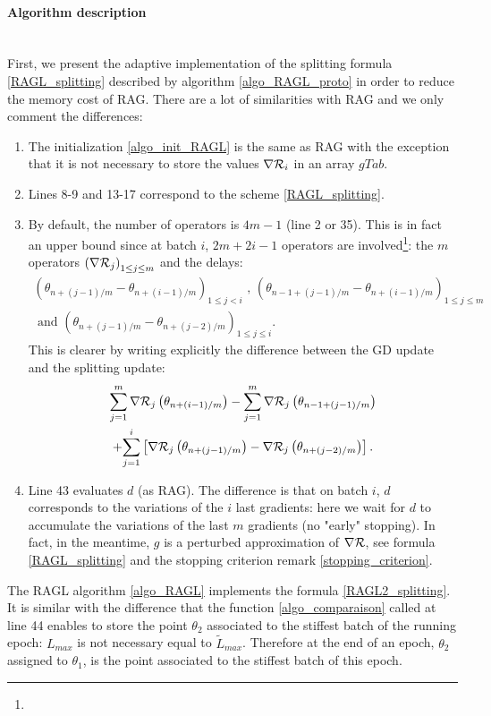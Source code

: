 \paragraph{Algorithm description}
~~\\
First, we present the adaptive implementation of the splitting formula \eqref{RAGL_splitting} described by algorithm \ref{algo_RAGL_proto} in order to reduce the memory cost of RAG. There are a lot of similarities with RAG and we only comment the differences:
\begin{enumerate}
	\item The initialization \ref{algo_init_RAGL} is the same as RAG with the exception that it is not necessary to store the values $\nabla \mathcal{R}_i$ in an array $gTab$.
	\item Lines 8-9 and 13-17 correspond to the scheme \eqref{RAGL_splitting}.
        \item By default, the number of operators is $4m-1$ (line 2 or 35). This is in fact an upper bound since at batch $i$, $2m+2i-1$ operators are involved\footnote{}: the $m$ operators $\left(\nabla \mathcal{R}_j\right)_{1\leq j \leq m}$ and the delays:
	\begin{multline*}
		\left(\theta_{n+(j-1)/m}-\theta_{n+(i-1)/m}\right)_{1\leq j<i} \text{ , } \left(\theta_{n-1+(j-1)/m}-\theta_{n+(i-1)/m}\right)_{1\leq j \leq m} \\ 
		\text{ and } \left(\theta_{n+(j-1)/m}-\theta_{n+(j-2)/m}\right)_{1\leq j \leq i}.
	\end{multline*}
	This is clearer by writing explicitly the difference between the GD update and the splitting update:
	\begin{multline*}
		\sum_{j=1}^m \nabla \mathcal{R}_j\left(\theta_{n+(i-1)/m}\right) - \sum_{j=1}^m \nabla \mathcal{R}_j\left(\theta_{n-1+(j-1)/m}\right) \\
		 + \displaystyle{\sum_{j=1}^i} \left[\nabla \mathcal{R}_j\left(\theta_{n+(j-1)/m}\right)-\nabla \mathcal{R}_j\left(\theta_{n+(j-2)/m}\right)\right]. 
	\end{multline*}
	\item Line 43 evaluates $d$ (as RAG). The difference is that on batch $i$, $d$ corresponds to the variations of the $i$ last gradients: here we wait for $d$ to accumulate
          the variations of the last $m$ gradients (no "early" stopping). In fact, in the meantime, $g$ is a perturbed approximation of $\nabla \mathcal{R}$, see formula \eqref{RAGL_splitting}
          and the stopping criterion remark \eqref{stopping_criterion}.
\end{enumerate}
The RAGL algorithm \ref{algo_RAGL} implements the formula \eqref{RAGL2_splitting}. It is similar with the difference that the function \eqref{algo_comparaison} called at line 44 enables to store the point $\theta_2$ associated to the stiffest batch of the running epoch: $L_{max}$ is not necessary equal to $\tilde{L}_{max}$. Therefore at the end of an epoch, $\theta_2$ assigned to $\theta_1$, is the point associated to the stiffest batch of this epoch. \\

